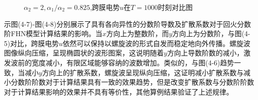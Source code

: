 \documentclass[twoside,UTF8]{nputhesis}
\begin{document}
\begin{figure}[htbp]
	\setlength{\abovecaptionskip}{-0.2cm} %
	\caption{$\alpha_{2}=2,\alpha_{1}/\alpha_{2}=0.825$,跨膜电势$u$在$T=1000$时刻对比图}
	\label{fig:1b}
	\vspace{-0.5cm} %
	
\end{figure}	
	
	

示图(4-7)-图(4-8)分别展示了具有各向异性的分数阶导数及扩散系数对于回火分数阶FHN模型计算结果的影响。当$x$方向上为整数阶，而$y$方向上为分数阶，与图(4-5)对比，跨膜电势$u$依然可以保持以螺旋波的形式自发而稳定地向外传播。螺旋波图像纵向压缩，呈现椭圆状的波形图案，这说明随着$y$方向上导数阶数的减小，激发波前的宽度减小，有限区域能够容纳的波数增加。类似的，与图(4-6)趋势一致，当减小$y$方向上的扩散系数，螺旋波呈现纵向压缩，这证明减小扩散系数与减小分数阶阶数对于计算结果具有一致的效果趋势，但是改变扩散系数与分数阶阶数对于计算结果影响的效果并不具有等价性，其他算例结果验证了上述规律。
\end{document}
